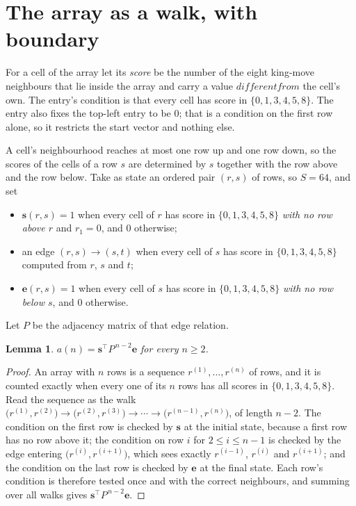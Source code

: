 \documentclass[11pt,a4paper]{article}
\theoremstyle{plain}
\newtheorem{lemma}[theorem]{Lemma}
\theoremstyle{definition}
\begin{document}
\section{The array as a walk, with boundary}

For a cell of the array let its \emph{score} be the number of the eight king-move neighbours that lie inside
the array and carry a value $different from$ the cell's own. The entry's condition is that every cell
has score in $\{0,1,3,4,5,8\}$. The entry also fixes the top-left entry to be $0$; that is a condition on the first row alone, so it restricts the start vector and nothing else.

A cell's neighbourhood reaches at most one row up and one row down, so the scores of the
cells of a row $s$ are determined by $s$ together with the row above and the row below.
Take as state an ordered pair $(r,s)$ of rows, so $S=64$, and set
\begin{itemize}
\item $\mathbf{s}(r,s)=1$ when every cell of $r$ has score in $\{0,1,3,4,5,8\}$ \emph{with no row
above $r$} and $r_1=0$, and $0$ otherwise;
\item an edge $(r,s)\to(s,t)$ when every cell of $s$ has score in $\{0,1,3,4,5,8\}$ computed from
$r$, $s$ and $t$;
\item $\mathbf{e}(r,s)=1$ when every cell of $s$ has score in $\{0,1,3,4,5,8\}$ \emph{with no row
below $s$}, and $0$ otherwise.
\end{itemize}
Let $P$ be the adjacency matrix of that edge relation.

\begin{lemma}\label{lem:walk}
$a(n)=\mathbf{s}^{\!\top}P^{\,n-2}\mathbf{e}$ for every $n\ge2$.
\end{lemma}

\begin{proof}
An array with $n$ rows is a sequence $r^{(1)},\dots,r^{(n)}$ of rows, and it is counted
exactly when every one of its $n$ rows has all scores in $\{0,1,3,4,5,8\}$. Read the sequence as the
walk $\bigl(r^{(1)},r^{(2)}\bigr)\to\bigl(r^{(2)},r^{(3)}\bigr)\to\cdots\to
\bigl(r^{(n-1)},r^{(n)}\bigr)$, of length $n-2$. The condition on the first row is
checked by $\mathbf{s}$ at the initial state, because a first row has no row above it; the
condition on row $i$ for $2\le i\le n-1$ is checked by the edge entering
$\bigl(r^{(i)},r^{(i+1)}\bigr)$, which sees exactly $r^{(i-1)}$, $r^{(i)}$ and
$r^{(i+1)}$; and the condition on the last row is checked by $\mathbf{e}$ at the final
state. Each row's condition is therefore tested once and with the correct neighbours, and
summing over all walks gives $\mathbf{s}^{\!\top}P^{\,n-2}\mathbf{e}$.
\end{proof}
\end{document}

